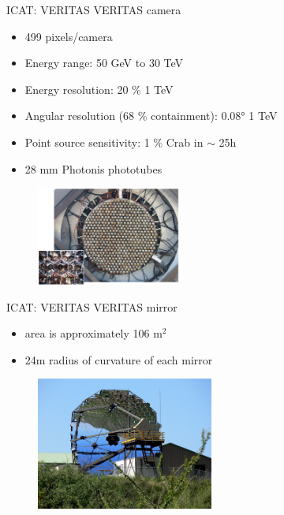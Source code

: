 \documentclass{beamer}
\begin{document}
\begin{frame}{ICAT: VERITAS}
    VERITAS camera
    \begin{itemize}
        \item 499 pixels/camera
        \item Energy range: 50 GeV to 30 TeV
        \item Energy resolution: 20 \% \@ 1 TeV
        \item Angular resolution (68 \% containment): 0.08° \@ 1 TeV
        \item Point source sensitivity: 1 \% Crab in $\sim$ 25h
        \item 28 mm Photonis phototubes
    \end{itemize}
    \begin{figure}[h]
        \includegraphics[width=180px]{VERITAS_camera.png}
    \end{figure}
\end{frame}


\begin{frame}{ICAT: VERITAS}
    VERITAS mirror
    \begin{itemize}
        \item area is approximately 106 $\text{m}^2$
        \item  24m radius of curvature of each mirror
    \end{itemize}

    \begin{figure}[h]
        \includegraphics[width=220px]{VERITAS_mirror.jpg}
    \end{figure}
\end{frame}
\end{document}
